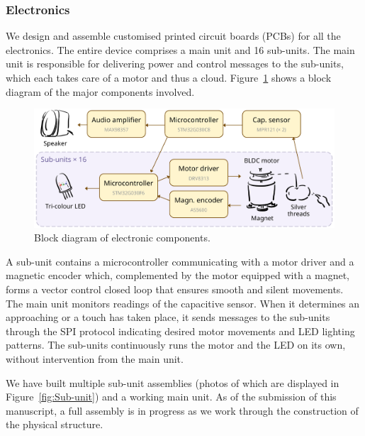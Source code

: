\documentclass{nimemusic}
\begin{document}
\subsubsection{Electronics}
We design and assemble customised printed circuit boards (PCBs) for all the electronics. The entire device comprises a main unit and 16 sub-units. The main unit is responsible for delivering power and control messages to the sub-units, which each takes care of a motor and thus a cloud. Figure~\ref{fig:Block} shows a block diagram of the major components involved.

\begin{figure}[h!]
  \includegraphics[width=1\textwidth]{Block.pdf}
  \caption{Block diagram of electronic components.}
  \label{fig:Block}
\end{figure}

A sub-unit contains a microcontroller communicating with a motor driver and a magnetic encoder which, complemented by the motor equipped with a magnet, forms a vector control closed loop that ensures smooth and silent movements. The main unit monitors readings of the capacitive sensor. When it determines an approaching or a touch has taken place, it sends messages to the sub-units through the SPI protocol indicating desired motor movements and LED lighting patterns. The sub-units continuously runs the motor and the LED on its own, without intervention from the main unit.

We have built multiple sub-unit assemblies (photos of which are displayed in Figure~\ref{fig:Sub-unit}) and a working main unit. As of the submission of this manuscript, a full assembly is in progress as we work through the construction of the physical structure.
\end{document}
